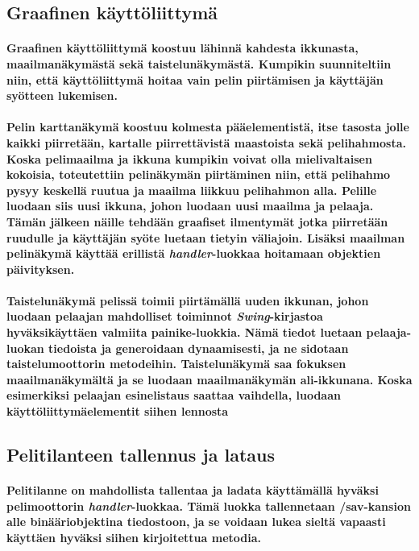 \documentclass[10pt,a4paper,draft]{article}
\begin{document}
\subsection{Graafinen käyttöliittymä}
\paragraph{Graafinen käyttöliittymä koostuu lähinnä kahdesta ikkunasta, maailmanäkymästä se\-kä taistelunäkymästä. Kumpikin suunniteltiin niin, että käyttöliittymä hoitaa vain pelin piirtämisen ja käyttäjän syötteen lukemisen.}
\paragraph{Pelin karttanäkymä koostuu kolmesta pääelementistä, itse tasosta jolle kaikki piirretään, kartalle piirrettävistä maastoista sekä pelihahmosta. Koska pelimaailma ja ikkuna kumpikin voivat olla mielivaltaisen kokoisia, toteutettiin pelinäkymän piir\-tä\-mi\-nen niin, että pelihahmo pysyy keskellä ruutua ja maailma liikkuu pelihahmon alla. Pelille luodaan siis uusi ikkuna, johon luodaan uusi maailma ja pelaaja. Tämän jälkeen näille tehdään graafiset ilmentymät jotka piirretään ruudulle ja käyttäjän syöte luetaan tietyin väliajoin. Lisäksi maailman pelinäkymä käyttää erillistä \emph{handler}-luokkaa hoitamaan objektien päivityksen.}
\paragraph{Taistelunäkymä pelissä toimii piirtämällä uuden ikkunan, johon luodaan pelaajan mahdolliset toiminnot \emph{Swing}-kirjastoa hyväksikäyttäen valmiita painike-luokkia. Nä\-mä tiedot luetaan pelaaja-luokan tiedoista ja generoidaan dynaamisesti, ja ne sidotaan taistelumoottorin metodeihin. Taistelunäkymä saa fokuksen maailmanäkymältä ja se luodaan maailmanäkymän ali-ikkunana. Koska esimerkiksi pelaajan esinelistaus saattaa vaihdella, luodaan käyttöliittymäelementit siihen lennosta}

\subsection{Pelitilanteen tallennus ja lataus}
\paragraph{Pelitilanne on mahdollista tallentaa ja ladata käyttämällä hyväksi pelimoottorin \emph{handler}-luokkaa. Tämä luokka tallennetaan /sav-kansion alle binääriobjektina tiedostoon, ja se voidaan lukea sieltä vapaasti käyttäen hyväksi siihen kirjoitettua metodia.}
\end{document}
